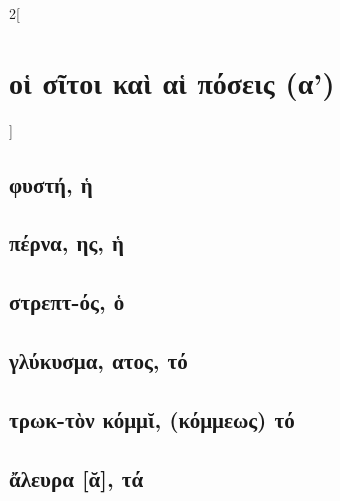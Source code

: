 \documentclass{book}
\begin{document}
\begin{multicols}{2}[\section{οἱ σῖτοι καὶ αἱ πόσεις (α')}]
\subsection{φυστή, ἡ}
\subsection{πέρνα, ης, ἡ}
\subsection{στρεπτ-ός, ὁ}
\subsection{γλύκυσμα, ατος, τό}
\subsection{τρωκ-τὸν κόμμῐ, (κόμμεως) τό}
\subsection{ἄλευρα [ᾰ], τά}
~
\end{multicols}
\newpage  
\end{document}
